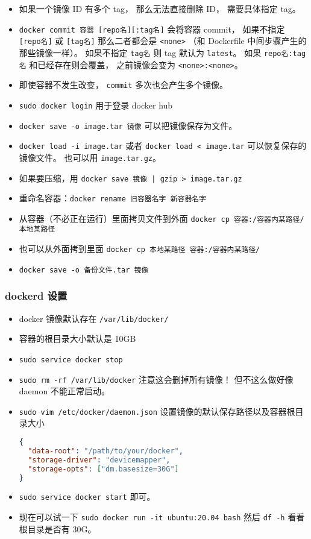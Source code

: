 \begin{itemize}
\item 如果一个镜像 ID 有多个 tag， 那么无法直接删除 ID， 需要具体指定 tag。
\item \verb`docker commit 容器 [repo名][:tag名]` 会将容器 commit， 如果不指定 \verb`[repo名]` 或 \verb`[tag名]` 那么二者都会是 \verb`<none>` （和 Dockerfile 中间步骤产生的那些镜像一样）。 如果不指定 \verb`tag名` 则 tag 默认为 \verb`latest`。 如果 \verb`repo名:tag名` 和已经存在则会覆盖， 之前镜像会变为 \verb`<none>:<none>`。
\item 即使容器不发生改变， \verb`commit` 多次也会产生多个镜像。
\item \verb`sudo docker login` 用于登录 docker hub
\item \verb`docker save -o image.tar 镜像` 可以把镜像保存为文件。
\item \verb`docker load -i image.tar` 或者 \verb`docker load < image.tar` 可以恢复保存的镜像文件。 也可以用 \verb`image.tar.gz`。
\item 如果要压缩，用 \verb`docker save 镜像 | gzip > image.tar.gz`
\item 重命名容器：\verb`docker rename 旧容器名字 新容器名字`
\item 从容器（不必正在运行）里面拷贝文件到外面 \verb`docker cp 容器:/容器内某路径/ 本地某路径`
\item 也可以从外面拷到里面 \verb`docker cp 本地某路径 容器:/容器内某路径/`
\item \verb`docker save -o 备份文件.tar 镜像`
\end{itemize}

\subsubsection{dockerd 设置}
\begin{itemize}
\item docker 镜像默认存在 \verb`/var/lib/docker/`
\item 容器的根目录大小默认是 10GB
\item \verb`sudo service docker stop`
\item \verb`sudo rm -rf /var/lib/docker` 注意这会删掉所有镜像！ 但不这么做好像 daemon 不能正常启动。
\item \verb`sudo vim /etc/docker/daemon.json` 设置镜像的默认保存路径以及容器根目录大小
\begin{lstlisting}[language=json]
{
  "data-root": "/path/to/your/docker",
  "storage-driver": "devicemapper",
  "storage-opts": ["dm.basesize=30G"]
}
\end{lstlisting}
\item \verb`sudo service docker start` 即可。
\item 现在可以试一下 \verb`sudo docker run -it ubuntu:20.04 bash` 然后 \verb`df -h` 看看根目录是否有 30G。
\end{itemize}


